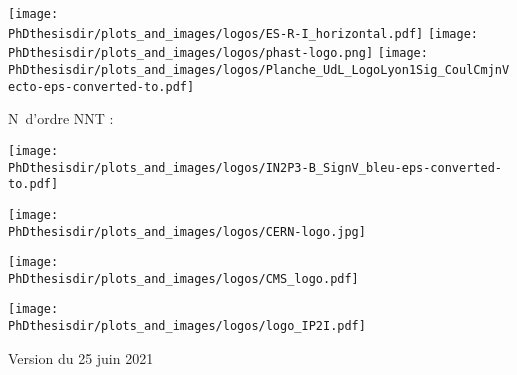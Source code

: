 \thispagestyle{empty}
\begin{center}
\large

\texttt{[image: \\PhDthesisdir/plots\_and\_images/logos/ES-R-I\_horizontal.pdf]}
\hfill
\texttt{[image: \\PhDthesisdir/plots\_and\_images/logos/phast-logo.png]}
\hfill
\texttt{[image: \\PhDthesisdir/plots\_and\_images/logos/Planche\_UdL\_LogoLyon1Sig\_CoulCmjnVecto-eps-converted-to.pdf]}

\vspace{1cm}

\begin{flushleft}
N\degree\ d'ordre NNT : \NordreNNT%
\end{flushleft}
\vspace{\baselineskip}



\vfill

\begin{minipage}[t]{.225\textwidth}
\begin{center}
\texttt{[image: \\PhDthesisdir/plots\_and\_images/logos/IN2P3-B\_SignV\_bleu-eps-converted-to.pdf]}
\end{center}
\end{minipage}
\hfill
\begin{minipage}[t]{.225\textwidth}
\begin{center}
\texttt{[image: \\PhDthesisdir/plots\_and\_images/logos/CERN-logo.jpg]}
\end{center}
\end{minipage}
\hfill
\begin{minipage}[t]{.225\textwidth}
\begin{center}
\texttt{[image: \\PhDthesisdir/plots\_and\_images/logos/CMS\_logo.pdf]}
\end{center}
\end{minipage}
\hfill
\begin{minipage}[t]{.225\textwidth}
\begin{center}
\texttt{[image: \\PhDthesisdir/plots\_and\_images/logos/logo\_IP2I.pdf]}
\end{center}
\end{minipage}

\vspace{.25cm}

{\scriptsize Version du 25 juin 2021}

\vspace{-1cm}
\end{center}